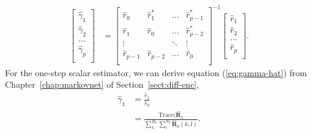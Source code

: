 \begin{align}
  \begin{bmatrix}
    \hat\gamma_{1} \\ \hat\gamma_{2} \\ \dots \\ \hat\gamma_{p} \\
  \end{bmatrix}
  &= 
  \begin{bmatrix}
    \hat r_{0} & \hat r_1^* & \dots  & \hat r_{p-1}^* \\
    \hat r_{1} & \hat r_0   & \dots  & \hat r_{p-2}^* \\
    \vdots      &         & \ddots & \vdots \\
    \hat r_{p-1} & \hat r_{p-2}   & \dots  & \hat r_{0} \\
  \end{bmatrix}^{-1}
  \begin{bmatrix}
    \hat r_{1} \\ \hat r_{2} \\ \dots \\ \hat r_{p} \\
  \end{bmatrix}. \label{eq:toep-sol-scalar-est}
\end{align}
For the one-step scalar estimator, we can derive equation (\ref{eq:gamma-hat}) from Chapter~\ref{chap:markovnet} of Section~\ref{sect:diff-enc},
\begin{align*}
  \hat{\gamma}_1 &= \frac{\hat{r}_1}{\hat{r}_0} \\
  &= \frac{\text{Trace}(\hat{\mathbf R}_1}{\sum_k^{R_d}\sum_l^{N_b}\hat{\mathbf R}_0(k,l)}.
\end{align*}